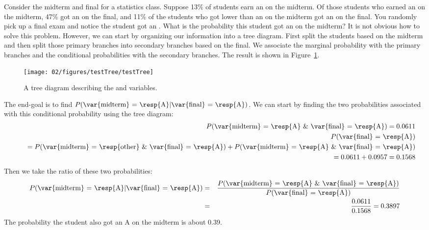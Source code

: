 \begin{example}{Consider the midterm and final for a statistics class. Suppose 13\% of students earn an  on the midterm. Of those students who earned an  on the midterm, 47\% got an  on the final, and 11\% of the students who got lower than an  on the midterm got an  on the final. You randomly pick up a final exam and notice the student got an . What is the probability this student got an  on the midterm?} \label{exerciseForTreeDiagramOfStudentGettingAOnMidtermGivenThatSheGotAOnFinal}
It is not obvious how to solve this problem. However, we can start by organizing our information into a tree diagram. First split the students based on the midterm and then split those primary branches into secondary branches based on the final. We associate the marginal probability with the primary branches and the conditional probabilities with the secondary branches. The result is shown in Figure~\ref{testTree}.
\begin{figure}[ht]
\centering
\texttt{[image: 02/figures/testTree/testTree]}
\caption{A tree diagram describing the  and  variables.}
\label{testTree}
\end{figure}

The end-goal is to find $P(\text{\var{midterm} = \resp{A}} | \text{\var{final} = \resp{A}})$. We can start by finding the two probabilities associated with this conditional probability using the tree diagram:
\begin{eqnarray*}
&&P(\text{\var{midterm} = \resp{A} \& \var{final} = \resp{A}}) = 0.0611 \\
&&P(\text{\var{final} = \resp{A}})  \\
&& \quad= P(\text{\var{midterm} = \resp{other} \& \var{final} = \resp{A}}) + P(\text{\var{midterm} = \resp{A} \& \var{final} = \resp{A}}) \\
&& \quad= 0.0611 + 0.0957 = 0.1568 \\
\end{eqnarray*}
Then we take the ratio of these two probabilities:
\begin{eqnarray*}
P(\text{\var{midterm} = \resp{A}} | \text{\var{final} = \resp{A}}) &=& \frac{P(\text{\var{midterm} = \resp{A} \& \var{final} = \resp{A}})}{P(\text{\var{final} = \resp{A}})} \\
&=& \frac{0.0611}{0.1568} = 0.3897
\end{eqnarray*}
The probability the student also got an A on the midterm is about 0.39.
\end{example}

